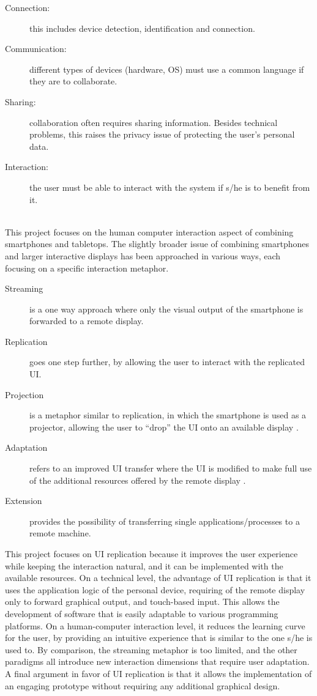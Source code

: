 \begin{description}
\item[Connection:] this includes device detection, identification and connection.
\item[Communication:] different types of devices (hardware, OS) must use a common language if they are to collaborate.   
\item[Sharing:] collaboration often requires sharing information. Besides technical problems, this raises the privacy issue of protecting the user's personal data.
\item[Interaction:] the user must be able to interact with the system if s/he is to benefit from it.
\end{description}
\hfill\\
This project focuses on the human computer interaction aspect of combining smartphones and tabletops.
The slightly broader issue of combining smartphones and larger interactive displays has been approached in various ways, each focusing on a specific interaction metaphor.
\begin{description}
\item[Streaming] is a one way approach where only the visual output of the smartphone is forwarded to a remote display.
\item[Replication] goes one step further, by allowing the user to interact with the replicated UI.
\item[Projection] is a metaphor similar to replication, in which the smartphone is used as a projector, allowing the user to ``drop'' the UI onto an available display \citep{Winkler:2011:interactivephonecall}.
\item[Adaptation] refers to an improved UI transfer where the UI is modified to make full use of the additional resources offered by the remote display \citep{Arthur:2011:xice}.
\item[Extension] provides the possibility of transferring single applications/processes to a remote  machine.
\end{description}

This project focuses on UI replication because it improves the user experience while keeping the interaction natural, and it can be implemented with the available resources.
On a technical level, the advantage of UI replication is that it uses the application logic of the personal device, requiring of the remote display only to forward graphical output, and touch-based input.
This allows the development of software that is easily adaptable to various programming platforms.
On a human-computer interaction level, it reduces the learning curve for the user, by providing an intuitive experience that is similar to the one s/he is used to.
By comparison, the streaming metaphor is too limited, and the other paradigms all introduce new interaction dimensions that require user adaptation.
A final argument in favor of UI replication is that it allows the implementation of an engaging prototype without requiring any additional graphical design.

